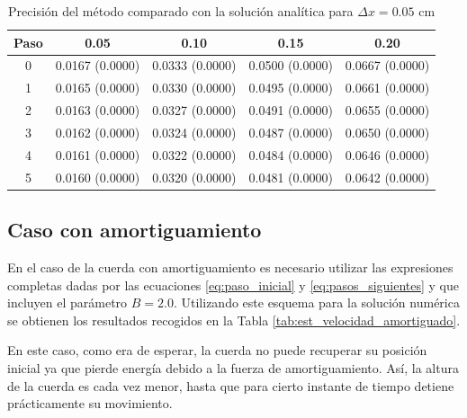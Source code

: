 \documentclass[11pt]{article}
\begin{document}
\begin{table}
\center
\begin{tabular}{ c c c c c }
\hline
Paso & 0.05 & 0.10 & 0.15 & 0.20 \\
\hline
\hline
0 & 0.0167 (0.0000) & 0.0333 (0.0000) & 0.0500 (0.0000) & 0.0667 (0.0000) \\
1 & 0.0165 (0.0000) & 0.0330 (0.0000) & 0.0495 (0.0000) & 0.0661 (0.0000) \\
2 & 0.0163 (0.0000) & 0.0327 (0.0000) & 0.0491 (0.0000) & 0.0655 (0.0000) \\
3 & 0.0162 (0.0000) & 0.0324 (0.0000) & 0.0487 (0.0000) & 0.0650 (0.0000) \\
4 & 0.0161 (0.0000) & 0.0322 (0.0000) & 0.0484 (0.0000) & 0.0646 (0.0000) \\
5 & 0.0160 (0.0000) & 0.0320 (0.0000) & 0.0481 (0.0000) & 0.0642 (0.0000) \\
\end{tabular}
\caption{Precisión del método comparado con la solución analítica para $\Delta{x} = 0.05$ cm}
\label{tab:comparativa3}
\end{table}

\subsection{Caso con amortiguamiento}
En el caso de la cuerda con amortiguamiento es necesario utilizar las expresiones
completas dadas por las ecuaciones \eqref{eq:paso_inicial} y \eqref{eq:pasos_siguientes}
y que incluyen el parámetro $B = 2.0$.
Utilizando este esquema para la solución numérica se obtienen los resultados recogidos en
la Tabla \ref{tab:est_velocidad_amortiguado}.

En este caso, como era de esperar, la cuerda no puede recuperar su posición inicial ya que
pierde energía debido a la fuerza de amortiguamiento. Así, la altura de la cuerda es 
cada vez menor, hasta que para cierto instante de tiempo detiene prácticamente su
movimiento.
\end{document}
